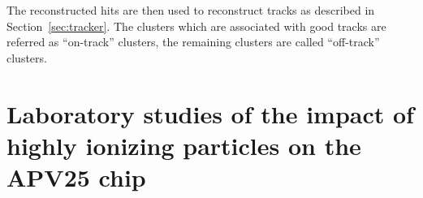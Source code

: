 


The reconstructed hits are then used to reconstruct tracks as described in Section~\ref{sec:tracker}. The clusters which are associated with good tracks are referred as ``on-track'' clusters, the remaining clusters are called ``off-track'' clusters.


\newpage

\section{Laboratory studies of the impact of highly ionizing particles on the APV25 chip~\label{sec:HIPinPast}}

